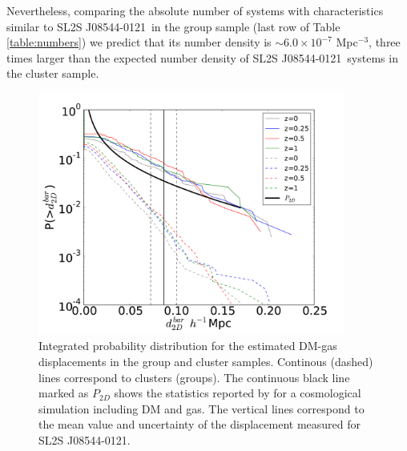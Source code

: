 \documentclass{emulateapj}
\newcommand{\bullg}{SL2S J08544-0121}
\begin{document}
Nevertheless, comparing the absolute number of systems with
characteristics similar to \bullg\ in the group sample
(last row of Table \ref{table:numbers}) we predict that its number
density is $\sim 6.0\times 10^{-7}$ Mpc$^{-3}$, three times larger
than the expected number density of \bullg\ systems in the cluster
sample. 


\begin{figure}
\begin{center}
\includegraphics[width=0.9\textwidth]{figure_3.pdf}
\end{center}
\caption{Integrated probability distribution for the estimated
  DM-gas displacements in the group and cluster samples. Continous (dashed)
  lines correspond to clusters (groups). The continuous black line
  marked as $P_{2D}$ shows the statistics reported by
  \citet{ForeroRomero2010} for a cosmological simulation including DM
  and gas. The vertical lines correspond to the mean value and
  uncertainty of the displacement measured for \bullg.} 
\label{fig:baryonic_displacements}
\end{figure}
\end{document}
